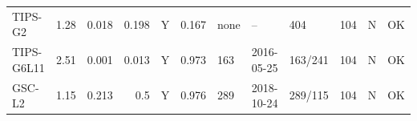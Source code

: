 \begin{longtable}{lrrrcrlllrcc}
TIPS-G2 & 1.28 & 0.018 & 0.198 & Y & 0.167 & none & -- & 404 & 104 & N & OK\\
TIPS-G6L11 & 2.51 & 0.001 & 0.013 & Y & 0.973 & 163 & 2016-05-25 & 163/241 & 104 & N & OK\\
GSC-L2 & 1.15 & 0.213 & 0.5 & Y & 0.976 & 289 & 2018-10-24 & 289/115 & 104 & N & OK\\

\end{longtable}
